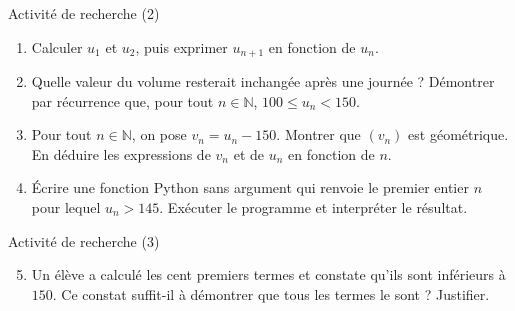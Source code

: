 \documentclass[aspectratio=169,10pt]{beamer}
\providecommand{\N}{\mathbb{N}}
\begin{document}
\begin{frame}{Activité de recherche (2)}
\begin{enumerate}
\setcounter{enumi}{0}\item Calculer \(u_1\) et \(u_2\), puis exprimer \(u_{n+1}\) en fonction de \(u_n\).

\item Quelle valeur du volume resterait inchangée après une journée ? Démontrer par récurrence que, pour tout \(n\in\N\), \(100\le u_n<150\).

\item Pour tout \(n\in\N\), on pose \(v_n=u_n-150\). Montrer que \((v_n)\) est géométrique. En déduire les expressions de \(v_n\) et de \(u_n\) en fonction de \(n\).

\item Écrire une fonction Python sans argument qui renvoie le premier entier \(n\) pour lequel \(u_n>145\). Exécuter le programme et interpréter le résultat.

\end{enumerate}
\end{frame}
\begin{frame}{Activité de recherche (3)}
\begin{enumerate}
\setcounter{enumi}{4}\item Un élève a calculé les cent premiers termes et constate qu'ils sont inférieurs à \(150\). Ce constat suffit-il à démontrer que tous les termes le sont ? Justifier.

\end{enumerate}
\end{frame}
\end{document}
